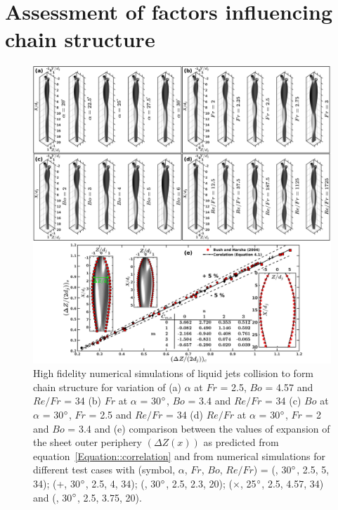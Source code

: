 \documentclass{jfm}
\begin{document}
\section{Assessment of factors influencing chain structure}
\begin{figure}
	\centering
	\includegraphics[width=\linewidth]{Figure6}
	\caption{High fidelity numerical simulations of liquid jets collision to form chain structure for variation of (a) $\alpha$ at $Fr$ = 2.5, $Bo$ = 4.57 and $Re/Fr$ = 34 (b) $Fr$ at $\alpha$ = 30$\degree$, $Bo$ = 3.4 and $Re/Fr$ = 34 (c) $Bo$ at $\alpha$ = 30$\degree$, $Fr$ = 2.5 and $Re/Fr$ = 34 (d)  $Re/Fr$ at $\alpha$ = 30$\degree$, $Fr$ = 2 and $Bo$ = 3.4 and (e) comparison between the values of expansion of the sheet outer periphery $\left(\Delta Z(x)\right)$ as predicted from equation~\ref{Equation::correlation} and from numerical simulations for different test cases with (symbol, $\alpha$, $Fr$, $Bo$, $Re/Fr$) = (\protect\MarkerSquareRed, 30$\degree$, 2.5, 5, 34); (+, 30$\degree$, 2.5, 4, 34); (\protect \MarkerDiamondBlack, 30$\degree$, 2.5, 2.3, 20); ($\times$, 25$\degree$, 2.5, 4.57, 34) and (\protect \MarkerCircleRed, 30$\degree$, 2.5, 3.75, 20).}
	\label{Figure::phaseContours}%
\end{figure}
\end{document}

